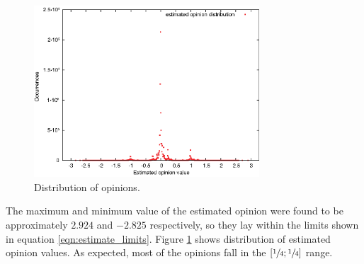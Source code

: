       \begin{figure}[H]
        \centering
        \includegraphics[width=0.75\textwidth]{chapters/03_implementation/opidist}
        \caption{Distribution of opinions.}
        \label{fig:opinion_distribution_reg}
      \end{figure}
      The maximum and minimum value of the estimated opinion were found to be approximately $2.924$ and $-2.825$ respectively, so they lay within the limits shown in equation \ref{eqn:estimate_limits}. Figure \ref{fig:opinion_distribution_reg} shows distribution of estimated opinion values. As expected, most of the opinions fall in the $[\sfrac{1}{4};\sfrac{1}{4}]$ range.
      
